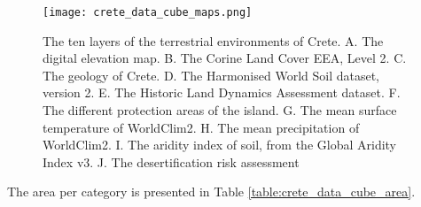 \begin{figure}[hbt!] 
    \centering\texttt{[image: crete\_data\_cube\_maps.png]}
    \caption[Crete data cube]{The ten layers of the terrestrial environments of Crete.
    A. The digital elevation map. B. The Corine Land Cover EEA, Level 2.
    C. The geology of Crete. D. The Harmonised World Soil dataset, version 2.
    E. The Historic Land Dynamics Assessment dataset. F. The different protection areas of the island.
    G. The mean surface temperature of WorldClim2. H. The mean precipitation of  WorldClim2.
    I. The aridity index of soil, from the Global Aridity Index v3. J. The desertification risk assessment}
    \label{fig:crete_data_cube_map}
\end{figure}


The area per category is presented in Table \ref{table:crete_data_cube_area}.

